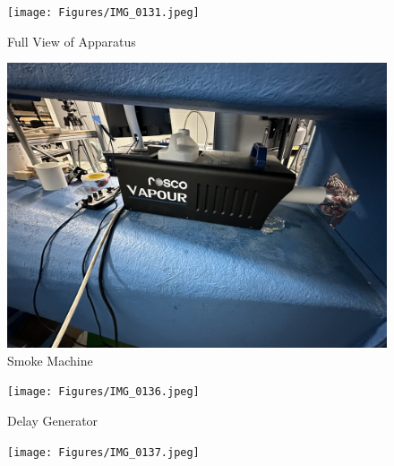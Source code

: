 \begin{figure}[htpb]
    \centering
    \texttt{[image: Figures/IMG\_0131.jpeg]}
    \caption{Full View of Apparatus}
    \label{fig:Full_Apparatus}
\end{figure}

\begin{figure}[htpb]
    \centering
    \includegraphics[width=0.75\linewidth]{Figures/IMG_0135.jpeg}
    \caption{Smoke Machine}
    \label{fig:Smoke_Machine}
\end{figure}

\begin{figure}[htpb]
    \centering
    \texttt{[image: Figures/IMG\_0136.jpeg]}
    \caption{Delay Generator}
    \label{fig:Delay_generator}
\end{figure}

\begin{figure}[htpb]
    \centering
    \texttt{[image: Figures/IMG\_0137.jpeg]}
    \caption{}
    \label{fig:}
\end{figure}



